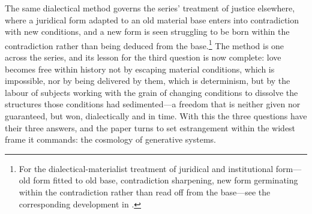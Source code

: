 \noindent
The same dialectical method governs the series' treatment of justice elsewhere, where a juridical form adapted to an old material base enters into contradiction with new conditions, and a new form is seen struggling to be born within the contradiction rather than being deduced from the base.\footnote{For the dialectical-materialist treatment of juridical and institutional form---old form fitted to old base, contradiction sharpening, new form germinating within the contradiction rather than read off from the base---see the corresponding development in \textcite{paperxiii}.} The method is one across the series, and its lesson for the third question is now complete: love becomes free within history not by escaping material conditions, which is impossible, nor by being delivered by them, which is determinism, but by the labour of subjects working with the grain of changing conditions to dissolve the structures those conditions had sedimented---a freedom that is neither given nor guaranteed, but won, dialectically and in time. With this the three questions have their three answers, and the paper turns to set estrangement within the widest frame it commands: the cosmology of generative systems.
